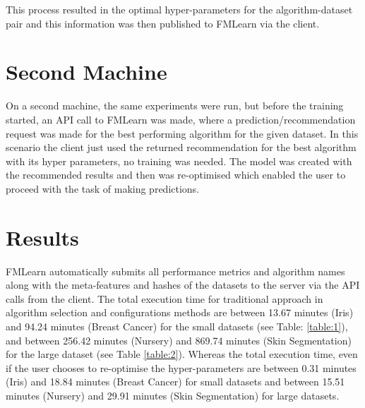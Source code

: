 This process resulted in the optimal hyper-parameters for the algorithm-dataset pair and this information was then published to FMLearn via the client.
 
\section*{Second Machine}

On a second machine, the same experiments were run, but before the training started, an API call to FMLearn was made, where a prediction/recommendation request was made for the best performing algorithm for the given dataset. In this scenario the client just used the returned recommendation for the best algorithm with its hyper parameters, no training was needed. The model was created with the recommended results and then was re-optimised which enabled the user to proceed with the task of making predictions.

\section{Results}

FMLearn automatically submits all performance metrics and algorithm names along with the meta-features and hashes of the datasets to the server via the API calls from the client. The total execution time for traditional approach in algorithm selection and configurations methods are between 13.67 minutes (Iris) and 94.24 minutes (Breast Cancer) for the small datasets (see Table: \ref{table:1}), and between 256.42 minutes (Nursery) and 869.74 minutes (Skin Segmentation) for the large dataset (see Table \ref{table:2}). Whereas the total execution time, even if the user chooses to re-optimise the hyper-parameters are between 0.31 minutes (Iris) and 18.84 minutes (Breast Cancer) for small datasets and between 15.51 minutes (Nursery) and 29.91 minutes (Skin Segmentation) for large datasets.

